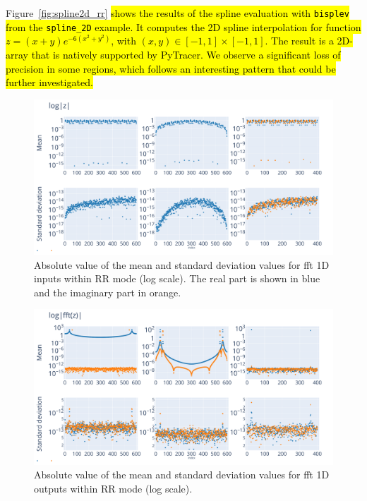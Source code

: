 \documentclass[10pt,journal,compsoc]{IEEEtran}
\DeclareRobustCommand{\add}[1]{\sethlcolor{lightgreen}\hl{#1}}
\begin{document}
Figure~\ref{fig:spline2d_rr} \add{shows the results of the spline evaluation with
    \texttt{bisplev} from the \texttt{spline\_2D} example. It computes the 2D spline
    interpolation for function $z=(x+y)e^{-6(x^2+y^2)}$, with $(x,y) \in
        [-1,1]\times[-1,1]$. The result is a 2D-array that is natively supported by
    PyTracer. We observe a significant loss of precision in some regions, which follows
    an interesting pattern that could be further investigated.}


\begin{figure}
    \centering
    \includegraphics[width=\linewidth]{figure/FFT/fft_x.pdf}
    \caption{Absolute value of the mean and standard deviation values for fft 1D
        inputs within RR mode (log scale). The real part is shown in blue and
        the imaginary part in orange.}
    \label{fig:fft1D_inputs}
\end{figure}

\begin{figure}
    \centering
    \includegraphics[width=\linewidth]{figure/FFT/fft_y.pdf}
    \caption{Absolute value of the mean and standard deviation values
        for fft 1D outputs within RR mode (log scale).}
    \label{fig:fft1D_outputs}
\end{figure}
\end{document}

